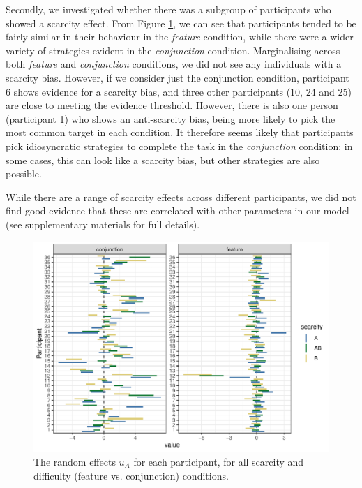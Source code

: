 \documentclass[12pt]{article}
\begin{document}
Secondly, we investigated whether there was a subgroup of participants who showed a scarcity effect. From Figure \ref{fig:random_effects}, we can see that participants tended to be fairly similar in their behaviour in the \textit{feature} condition, while there were a wider variety of strategies evident in the \textit{conjunction} condition. Marginalising across both \textit{feature} and \textit{conjunction} conditions, we did not see any individuals with a scarcity bias. However, if we consider just the conjunction condition, participant 6 shows evidence for a scarcity bias, and three other participants (10, 24 and 25) are close to meeting the evidence threshold. However, there is also one person (participant 1) who shows an anti-scarcity bias, being more likely to pick the most common target in each condition. It therefore seems likely that participants pick idiosyncratic strategies to complete the task in the \textit{conjunction} condition: in some cases, this can look like a scarcity bias, but other strategies are also possible.

While there are a range of scarcity effects across different participants, we did not find good evidence that these are correlated with other parameters in our model (see supplementary materials for full details).

\begin{figure}[H]
    \centering
    \includegraphics[width=\textwidth]{figs/random_effects.pdf}
    \caption{The random effects $u_A$ for each participant, for all scarcity and difficulty (feature vs. conjunction) conditions.}
    \label{fig:random_effects}
\end{figure}
\end{document}
